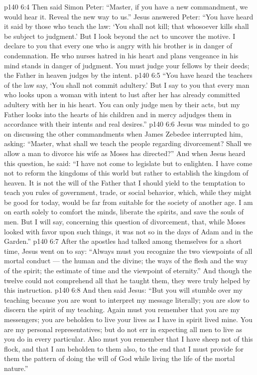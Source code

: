 \vs p140 6:4 Then said Simon Peter: “Master, if you have a new commandment, we would hear it. Reveal the new way to us.” Jesus answered Peter: \textcolor{ubdarkred}{“You have heard it said by those who teach the law: ‘You shall not kill; that whosoever kills shall be subject to judgment.’ But I look beyond the act to uncover the motive. I declare to you that every one who is angry with his brother is in danger of condemnation. He who nurses hatred in his heart and plans vengeance in his mind stands in danger of judgment. You must judge your fellows by their deeds; the Father in heaven judges by the intent.}
\vs p140 6:5 \textcolor{ubdarkred}{“You have heard the teachers of the law say, ‘You shall not commit adultery.’ But I say to you that every man who looks upon a woman with intent to lust after her has already committed adultery with her in his heart. You can only judge men by their acts, but my Father looks into the hearts of his children and in mercy adjudges them in accordance with their intents and real desires.”}
\vs p140 6:6 Jesus was minded to go on discussing the other commandments when James Zebedee interrupted him, asking: “Master, what shall we teach the people regarding divorcement? Shall we allow a man to divorce his wife as Moses has directed?” And when Jesus heard this question, he said: \textcolor{ubdarkred}{“I have not come to legislate but to enlighten. I have come not to reform the kingdoms of this world but rather to establish the kingdom of heaven. It is not the will of the Father that I should yield to the temptation to teach you rules of government, trade, or social behavior, which, while they might be good for today, would be far from suitable for the society of another age. I am on earth solely to comfort the minds, liberate the spirits, and save the souls of men. But I will say, concerning this question of divorcement, that, while Moses looked with favor upon such things, it was not so in the days of Adam and in the Garden.”}
\vs p140 6:7 After the apostles had talked among themselves for a short time, Jesus went on to say: \textcolor{ubdarkred}{“Always must you recognize the two viewpoints of all mortal conduct --- the human and the divine; the ways of the flesh and the way of the spirit; the estimate of time and the viewpoint of eternity.”} And though the twelve could not comprehend all that he taught them, they were truly helped by this instruction.
\vs p140 6:8 And then said Jesus: \textcolor{ubdarkred}{“But you will stumble over my teaching because you are wont to interpret my message literally; you are slow to discern the spirit of my teaching. Again must you remember that you are my messengers; you are beholden to live your lives as I have in spirit lived mine. You are my personal representatives; but do not err in expecting all men to live as you do in every particular. Also must you remember that I have sheep not of this flock, and that I am beholden to them also, to the end that I must provide for them the pattern of doing the will of God while living the life of the mortal nature.”}
